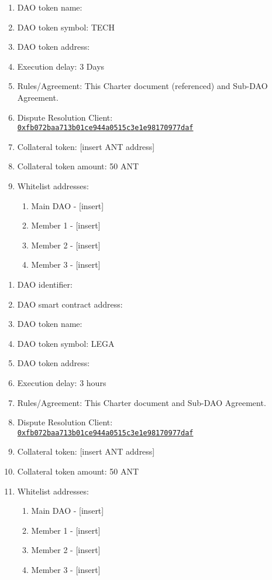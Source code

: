 \begin{itemize}
\begin{enumerate}[noitemsep]
	\end{enumerate}

	\begin{enumerate}[noitemsep]
		\item \ac{DAO} token name:
		\item \ac{DAO} token symbol: TECH
		\item \ac{DAO} token address:
		\item Execution delay: 3 Days
		\item Rules/Agreement: This Charter document (referenced) and Sub-\ac{DAO} Agreement.
		\item Dispute Resolution Client:\\ \href{https://etherscan.io/address/0xfb072baa713b01ce944a0515c3e1e98170977daf}{\texttt{0xfb072baa713b01ce944a0515c3e1e98170977daf}}
		\item Collateral token: [insert \ac{ANT} address]
		\item Collateral token amount: 50 \ac{ANT}
		\item Whitelist addresses:
		\begin{enumerate}
			\item Main \ac{DAO} - [insert]
			\item Member 1 - [insert]
			\item Member 2 - [insert]
			\item Member 3 - [insert]
		\end{enumerate}
	
	\end{enumerate}

	\begin{enumerate}[noitemsep]
		\item \ac{DAO} identifier:
		\item \ac{DAO} smart contract address:
		\item \ac{DAO} token name:
		\item \ac{DAO} token symbol: LEGA
		\item \ac{DAO} token address:
		\item Execution delay: 3 hours
		\item Rules/Agreement: This Charter document and Sub-\ac{DAO} Agreement.
		\item Dispute Resolution Client:\\ \href{https://etherscan.io/address/0xfb072baa713b01ce944a0515c3e1e98170977daf}{\texttt{0xfb072baa713b01ce944a0515c3e1e98170977daf}}
		\item Collateral token: [insert \ac{ANT} address]
		\item Collateral token amount: 50 \ac{ANT}
		\item Whitelist addresses:
		\begin{enumerate}
			\item Main \ac{DAO} - [insert]
			\item Member 1 - [insert]
			\item Member 2 - [insert]
			\item Member 3 - [insert]
		\end{enumerate}
	

\end{enumerate}
\end{itemize}
